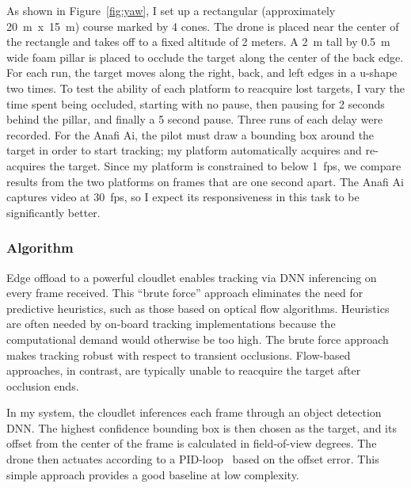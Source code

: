As shown in Figure~\ref{fig:yaw}, I set up a rectangular
(approximately 20~m~x~15~m) course marked by 4 cones.  The drone is
placed near the center of the rectangle and takes off to a fixed
altitude of 2 meters. A 2~m tall by 0.5~m wide foam pillar is placed
to occlude the target along the center of the back edge. For each run,
the target moves along the right, back, and left edges in a u-shape
two times. To test the ability of each platform to reacquire lost
targets, I vary the time spent being occluded, starting with no
pause, then pausing for 2 seconds behind the pillar, and finally a 5
second pause. Three runs of each delay were recorded.  For the Anafi
Ai, the pilot must draw a bounding box around the target in order to
start tracking; my platform automatically acquires and re-acquires
the target.  Since my platform is constrained to below 1~fps, we
compare results from the two platforms on frames that are one second
apart.  The Anafi Ai captures video at 30~fps, so I expect its
responsiveness in this task to be significantly better.

\subsubsection{Algorithm}
\label{sec:tracking-algorithm-basic}
Edge offload to a powerful cloudlet enables tracking via DNN
inferencing on every frame received.  This ``brute force'' approach
eliminates the need for predictive heuristics, such as those based on
optical flow algorithms.  Heuristics are often needed by on-board
tracking implementations because the computational demand would
otherwise be too high.  The brute force approach makes tracking robust
with respect to transient occlusions.  Flow-based approaches, in
contrast, are typically unable to reacquire the target after occlusion
ends.

In my system, the cloudlet inferences each frame through an object
detection DNN. The highest confidence bounding box is then chosen as
the target, and its offset from the center of the frame is calculated
in field-of-view degrees. The drone then actuates according to a
PID-loop~\cite{Ang2005} based on the offset error.  This simple
approach provides a good baseline at low complexity.

